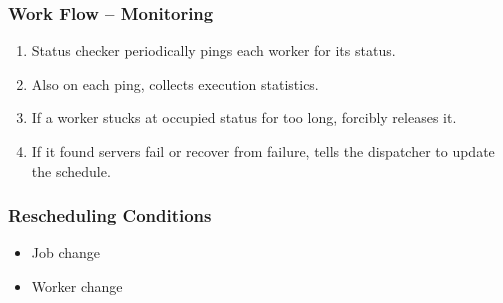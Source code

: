 \begin{frame}
  \frametitle{Work Flow -- Monitoring}
  \begin{enumerate}
    \item Status checker periodically pings each worker for its status.
    \item Also on each ping, collects execution statistics.
    \item If a worker stucks at occupied status for too long, forcibly
      releases it.
    \item If it found servers fail or recover from failure, tells the
      dispatcher to update the schedule.
  \end{enumerate}
\end{frame}
\begin{frame}
  \frametitle{Rescheduling Conditions}
  \begin{itemize}
    \item Job change
    \item Worker change
  \end{itemize}
\end{frame}

